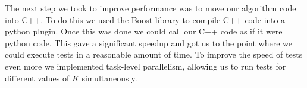 The next step we took to improve performance was to move our algorithm code into
C++. To do this we used the Boost library \cite{boost} to compile C++ code into a python
plugin. Once this was done we could call our C++ code as if it were python code.
This gave a significant speedup and got us to the point where we could execute
tests in a reasonable amount of time. To improve the speed of tests even more we
implemented task-level parallelism, allowing us to run tests for different
values of $K$ simultaneously.

%
